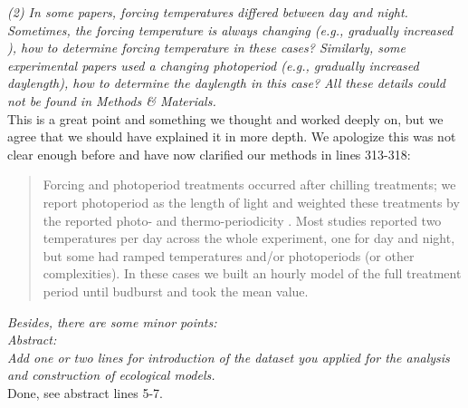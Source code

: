 \documentclass[11pt]{article}
\begin{document}
\emph{(2) In some papers, forcing temperatures differed between day and night. Sometimes, the forcing temperature is always changing (e.g., gradually increased ), how to determine forcing temperature in these cases? Similarly, some experimental papers used a changing photoperiod (e.g., gradually increased daylength), how to determine the daylength in this case? All these details could not be found in Methods \& Materials.}\\

This is a great point and something we thought and worked deeply on, but we agree that we should have explained it in more depth. We apologize this was not clear enough before and have now clarified our methods in lines 313-318: \\
\begin{quote}
Forcing and photoperiod treatments occurred after chilling treatments; we report photoperiod as the length of light and weighted these treatments by the reported photo- and thermo-periodicity \citep{buonaiuto2023experimental}. Most studies reported two temperatures per day across the whole experiment, one for day and night, but some had ramped temperatures and/or photoperiods (or other complexities). In these cases we built an hourly model of the full treatment period until budburst and took the mean value. 
\end{quote}

\emph{Besides, there are some minor points:}\\


\emph{Abstract:}\\
\emph{Add one or two lines for introduction of the dataset you applied for the analysis and construction of ecological models.}\\
Done, see abstract lines 5-7.\\
\end{document}
